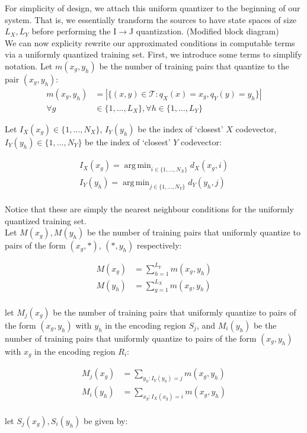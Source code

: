 \documentclass[10pt]{article}
\DeclareMathOperator*{\argmin}{arg\,min}
\begin{document}
For simplicity of design, we attach this uniform quantizer to the beginning of our system. That is, we essentially transform the sources to have state spaces of size $L_X, L_Y$ before performing the I$\rightarrow$J quantization. (Modified block diagram)\\

We can now explicity rewrite our approximated conditions in computable terms via a uniformly quantized training set. First, we introduce some terms to simplify notation. Let $m(x_g, y_h)$ be the number of training pairs that quantize to the pair $(x_g,y_h)$:\\

\begin{align}
    m(x_g, y_h)&=|\{(x,y) \in \mathcal{T} : q_X(x) = x_g, q_Y(y) = y_h\}|\\
    \forall g&\in \{1,\ldots,L_X\}, \forall h\in \{1,\ldots,L_Y\}\nonumber
\end{align}

Let $I_X(x_g)\in\{1,\ldots,N_X\}$, $I_Y(y_h)$ be the index of `closest' $X$ codevector, $I_Y(y_h)\in\{1,\ldots,N_Y\}$ be the index of `closest' $Y$ codevector:

\begin{align}
    \label{eq:I_X}
    I_X(x_g)=\argmin_{i \in \{1,\dots,N_X\}}d_X(x_g,i)\\
    \label{eq:I_Y}
    I_Y(y_h)=\argmin_{j \in \{1,\dots,N_Y\}}d_Y(y_h,j)
\end{align}
\\
Notice that these are simply the nearest neighbour conditions for the uniformly quantized training set.\\

Let $M(x_g), M(y_h)$ be the number of training pairs that uniformly quantize to pairs of the form $(x_g, *)$, $(*, y_h)$ respectively:

\begin{align}
    M(x_g) &= {\sum_{h=1}^{L_Y}m(x_g,y_h)}\\
    M(y_h) &= {\sum_{g=1}^{L_X}m(x_g,y_h)}
\end{align}
\\
let $M_j(x_g)$ be the number of training pairs that uniformly quantize to pairs of the form $(x_g, y_h)$ with $y_h$ in the encoding region $S_j$, and $M_i(y_h)$ be the number of training pairs that uniformly quantize to pairs of the form $(x_g, y_h)$ with $x_g$ in the encoding region $R_i$:

\begin{align}
    M_j(x_g) &= \sum_{y_h:I_Y(y_h)=j}m(x_g,y_h) \\
    M_i(y_h) &= \sum_{x_g:I_X(x_g)=i}m(x_g,y_h)
\end{align}
\\
let $S_j(x_g), S_i(y_h)$ be given by:
\end{document}
